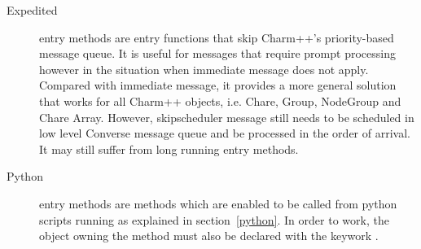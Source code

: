 \begin{description}
\item[Expedited] entry methods are entry functions 
that skip Charm++'s priority-based message queue. It is useful for messages that
require prompt processing however in the situation when immediate message does
not apply. Compared with immediate message, it provides a more general solution
that works for all Charm++ objects, i.e. Chare, Group, NodeGroup and Chare
Array. However, skipscheduler message still needs to be scheduled in low level
Converse message queue and be processed in the order of arrival. It may still
suffer from long running entry methods.


\item[Python] entry methods are methods which are enabled to be
called from python scripts running as explained in section~\ref{python}. In
order to work, the object owning the method must also be declared with the
keywork .

\end{description}
